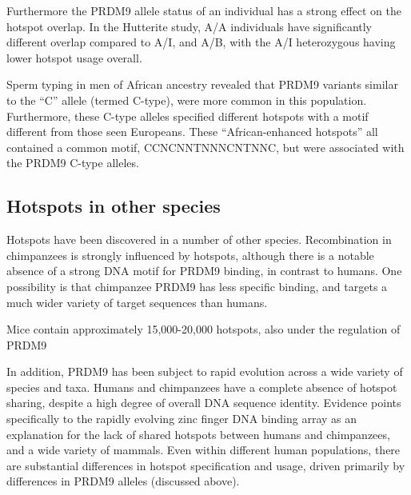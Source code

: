 Furthermore the PRDM9 allele status of an individual has a strong effect on the hotspot overlap.
In the Hutterite study, A/A individuals have significantly different overlap compared to A/I, and A/B, with the A/I heterozygous having lower hotspot usage overall\cite{Baudat2010}.


Sperm typing in men of African ancestry revealed that PRDM9 variants similar to the ``C'' allele (termed C-type), were more common in this population.
Furthermore, these C-type alleles specified different hotspots with a motif different from those seen Europeans\cite{Berg2011}. 
These ``African-enhanced hotspots'' all contained a common motif, CCNCNNTNNNCNTNNC, but were associated with the PRDM9 C-type alleles.




\subsection{Hotspots in other species}

Hotspots have been discovered in a number of other species.
Recombination in chimpanzees is strongly influenced by hotspots, although there is a notable absence of a strong DNA motif for PRDM9 binding, in contrast to humans\cite{Auton2012a}.
One possibility is that chimpanzee PRDM9 has less specific binding, and targets a much wider variety of target sequences than humans.

Mice contain approximately 15,000-20,000 hotspots, also under the regulation of PRDM9\cite{Brick2012,Smagulova2011}


In addition, PRDM9 has been subject to rapid evolution across a wide variety of species and taxa\cite{Oliver2009,Ponting2011}.
Humans and chimpanzees have a complete absence of hotspot sharing, despite a high degree of overall DNA sequence identity\cite{Ptak2005,Winckler2005,Auton2012a}.
Evidence points specifically to the rapidly evolving zinc finger DNA binding array as an explanation for the lack of shared hotspots between humans and chimpanzees\cite{Myers2010}, and a wide variety of mammals\cite{Oliver2009,Ponting2011,Thomas2009}.
Even within different human populations, there are substantial differences in hotspot specification and usage, driven primarily by differences in PRDM9 alleles (discussed above).

